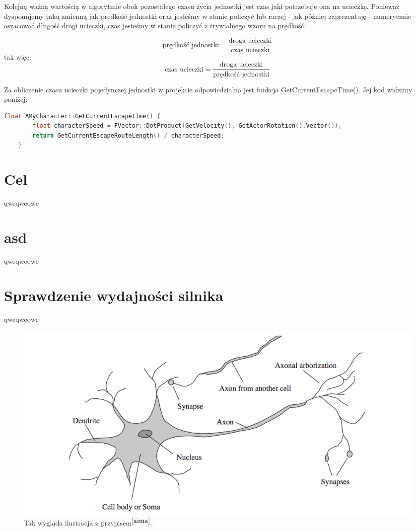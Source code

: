 \documentclass[12pt]{report}
\begin{document}
Kolejną ważną wartością w algorytmie obok pozostałego czasu życia jednostki jest czas jaki potrzebuje ona na ucieczkę. Ponieważ dysponujemy taką zmienną jak prędkość jednostki oraz jesteśmy w stanie policzyć lub raczej - jak później zaprezentuję - numerycznie oszacować długość drogi ucieczki, czas jesteśmy w stanie policzyć z trywialnego wzoru na prędkość:

\[ \text{prędkość jednostki} =  \dfrac{\text{droga ucieczki}}{\text{czas ucieczki}}  \]
tak więc:
\[ {\text{czas ucieczki}} =  \dfrac{\text{droga ucieczki}}{\text{prędkość jednostki}}  \]


Za obliczenie czasu ucieczki pojedynczej jednostki w projekcie odpowiedzialna jest funkcja GetCurrentEscapeTime(). Jej kod widzimy poniżej: 

\begin{lstlisting}[language=C++, backgroundcolor=\color{black!5}, basicstyle=\footnotesize, caption=Funkcja GetCurrentEscapeTime w klasie AMyCharacter.cpp.]
	float AMyCharacter::GetCurrentEscapeTime() {
		float characterSpeed = FVector::DotProduct(GetVelocity(), GetActorRotation().Vector());
		return GetCurrentEscapeRouteLength() / characterSpeed;
	}
\end{lstlisting}
\section{Cel}
qweqweqwe
\section{asd}
qweqweqwe
\section{Sprawdzenie wydajności silnika}
qweqweqwe




















\begin{figure}[h!]
\includegraphics[width=\textwidth]{neuron}
\caption{Tak wygląda ilustracja z przypisem$^{\cite{aima}}$.}
\end{figure}
\end{document}
